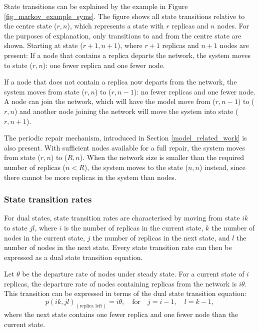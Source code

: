 \documentclass[10pt,a4paper,conference]{IEEEtran}
\begin{document}
State transitions can be explained by the example in Figure \ref{fig_markov_example_syms}. The figure shows all state transitions relative to the centre state ($r,n$), which represents a state with $r$ replicas and $n$ nodes. For the purposes of explanation, only transitions to and from the centre state are shown. Starting at state ($r+1,n+1$), where $r+1$ replicas and $n+1$ nodes are present: If a node that contains a replica departs the network, the system moves to state ($r,n$): one fewer replica and one fewer node.

If a node that does not contain a replica now departs from the network, the system moves from state ($r,n$) to ($r,n-1$): no fewer replicas and one fewer node. A node can join the network, which will have the model move from ($r,n-1$) to ($r,n$) and another node joining the network will move the system into state ($r,n+1$).

The periodic repair mechanism, introduced in Section \ref{model_related_work} is also present. With sufficient nodes available for a full repair, the system moves from state ($r,n$) to ($R,n$). When the network size is smaller than the required number of replicas ($n<R$), the system moves to the state ($n,n$) instead, since there cannot be more replicas in the system than nodes.

\subsubsection{State transition rates}
\label{state_transition_rates}

For dual states, state transition rates are characterised by moving from state $i k$ to state $j l$, where $i$ is the number of replicas in the current state, $k$ the number of nodes in the current state, $j$ the number of replicas in the next state, and $l$ the number of nodes in the next state. Every state transition rate can then be expressed as a dual state transition equation.

Let $\theta$ be the departure rate of nodes under steady state. For a current state of $i$ replicas, the departure rate of nodes containing replicas from the network is $i\theta$. This transition can be expressed in terms of the dual state transition equation:
%
\begin{equation} \label{eq_rep_left}
    p(i k,j l)_{(\textrm{replica left})} = i\theta,\quad\textrm{for}\quad j = i - 1,\quad l = k - 1,
\end{equation}
%
where the next state contains one fewer replica and one fewer node than the current state.
\end{document}
